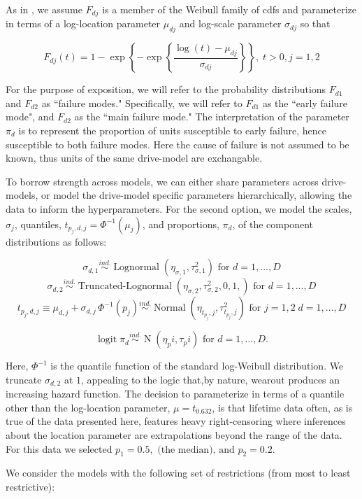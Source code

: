 \documentclass[12pt]{article}
\newcommand{\ind}{\stackrel{ind.}{\sim}}
\newcommand{\op}{\operatorname}
\begin{document}
As in \cite{chan}, we assume $F_{dj}$ is a member of the Weibull family of cdfs and parameterize in terms of a log-location parameter $\mu_{dj}$ and log-scale parameter $\sigma_{dj}$ so that

$$F_{dj}(t) = 1 - \exp \left\{ -\exp \left\{ \frac{ \log (t) - \mu_{dj}}{\sigma_{dj}} \right\} \right\},\; t>0, j=1,2$$

For the purpose of exposition, we will refer to the probability distributions $F_{d1}$ and $F_{d2}$ as ``failure modes." Specifically, we will refer to $F_{d1}$ as the ``early failure mode", and $F_{d2}$ as the ``main failure mode." The interpretation of the parameter $\pi_d$ is to represent the proportion of units susceptible to early failure, hence susceptible to both failure modes. Here the cause of failure is not assumed to be known, thus units of the same drive-model are exchangable.

To borrow strength across models, we can either share parameters across drive-models, or model the drive-model specific parameters hierarchically, allowing the data to inform the hyperparameters. For the second option, we model the scales, $\sigma_j$, quantiles, $t_{p_j,d,j} = \Phi^{-1}(\mu_j)$, and proportions, $\pi_d$, of the component distributions as follows:

$$\sigma_{d,1} \ind \op{Lognormal} \left( \eta_{\sigma,1}, \tau^2_{\sigma,1} \right) \mbox{ for } d=1,\ldots,D$$
$$\sigma_{d,2} \ind \op{Truncated-Lognormal} \left( \eta_{\sigma,2}, \tau^2_{\sigma,2} , 0, 1, \right) \mbox{ for } d=1,\ldots,D$$
$$t_{p_j,d,j} \equiv \mu_{d,j} + \sigma_{d,j}\,\Phi^{-1}(p_j)  \ind \op{Normal} \left(\eta_{t_{p_j},j}, \tau^2_{t_{p_j},j}\right) \mbox{ for } j=1,2\; d=1,\ldots,D$$

$$\op{logit} \pi_d \ind \op{N}(\eta_pi, \tau_pi) \mbox{ for } d=1,\ldots,D.$$

Here, $\Phi^{-1}$ is the quantile function of the standard log-Weibull distribution. We truncate $\sigma_{d,2}$ at $1$, appealing to the logic that,by nature, wearout produces an increasing hazard function. The decision to parameterize in terms of a quantile other than the log-location parameter, $\mu = t_{0.632}$, is that lifetime data often, as is true of the data presented here, features heavy right-censoring where inferences about the location parameter are extrapolations beyond the range of the data. For this data we selected $p_1=0.5,\mbox{ (the median), and } p_2 = 0.2$.

We consider the models with the following set of restrictions (from most to least restrictive):
\end{document}
